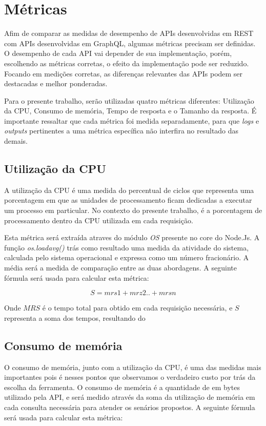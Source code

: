 \section{Métricas}\label{sec:metrics}

Afim de comparar as medidas de desempenho de APIs desenvolvidas em REST com APIs desenvolvidas em GraphQL, algumas métricas precisam ser definidas. O desempenho de cada API vai depender de sua implementação, porém, escolhendo as métricas corretas, o efeito da implementação pode ser reduzido. Focando em medições corretas, as diferenças relevantes das APIs podem ser destacadas e melhor ponderadas.

Para o presente trabalho, serão utilizadas quatro métricas diferentes: Utilização da CPU, Consumo de memória, Tempo de resposta e o Tamanho da resposta. É importante ressaltar que cada métrica foi medida separadamente, para que \textit{logs} e \textit{outputs} pertinentes a uma métrica específica não interfira no resultado das demais.

\subsection*{Utilização da CPU}

A utilização da CPU é uma medida do percentual de ciclos que representa uma porcentagem em que as unidades de processamento ficam dedicadas a executar um processo em particular. No contexto do presente trabalho, é a porcentagem de processamento dentro da CPU utilizada em cada requisição.

Esta métrica será extraída atraves do módulo \textit{OS} presente no \textrm{core} do Node.Js. A função \textit{os.loadavg()} trás como resultado uma medida da atividade do sistema, calculada pelo sistema operacional e expressa como um número fracionário. A média será a medida de comparação entre as duas abordagens. A seguinte fórmula será usada para calcular esta métrica: 

$$S=mrs1+mrz2..+mrsn$$

Onde $MRS$ é o tempo total para obtido em cada requisição necessária, e $S$ representa a soma dos tempos, resultando do 

\subsection*{Consumo de memória}

O consumo de memória, junto com a utilização da CPU, é uma das medidas mais importantes pois é nesses pontos que observamos o verdadeiro custo por trás da escolha da ferramenta. O consumo de memória é a quantidade de em bytes utilizado pela API, e será medido através da soma da utilização de memória em cada consulta necessária para atender os senários propostos. A seguinte fórmula será usada para calcular esta métrica: 

